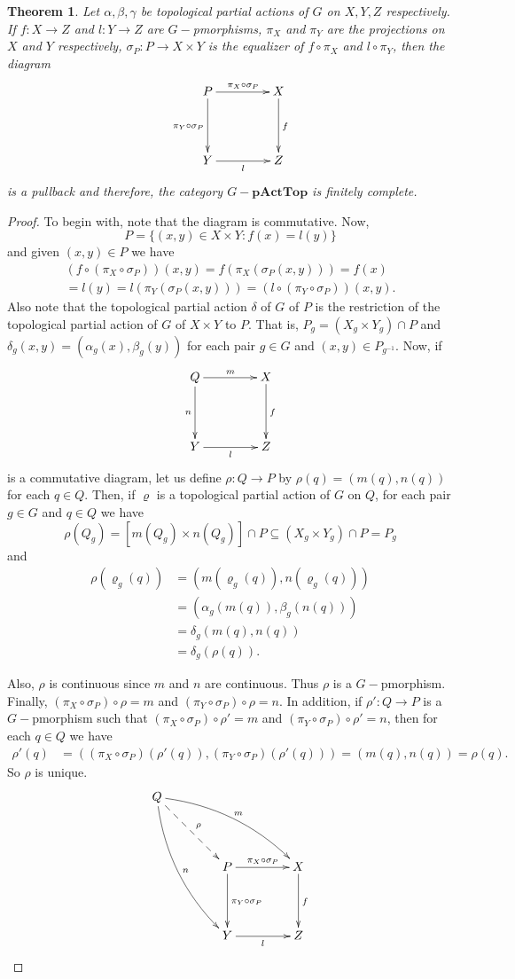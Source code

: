\documentclass[sn-mathphys-num]{sn-jnl}%
\theoremstyle{thmstyleone}%
\newtheorem{theorem}{Theorem}%
\theoremstyle{thmstyletwo}%
\theoremstyle{thmstylethree}%
\begin{document}
\begin{theorem}
Let $ \alpha, \beta, \gamma $ be topological partial actions of $ G $ on $ X, Y, Z $ respectively. If $ f: X \to Z $ and $l: Y \to Z $ are $G-$pmorphisms, $\pi_X$ and $ \pi_Y $ are the projections  on $ X $ and $ Y $ respectively, $\sigma_P:P\to X\times Y$ is the equalizer of $f\circ \pi_X$ and $l\circ \pi_Y$, then the diagram
$$
\xymatrix@=1.5cm{
P \ar[r]^{\pi_X\circ\sigma_P} \ar[d]_{\pi_Y\circ\sigma_P} & X\ar[d]^{f}\\
Y\ar[r]_{l}& Z
}
$$
is a pullback and therefore, the category $G-\mathbf{pActTop}$ is finitely complete.
\end{theorem}
\begin{proof}[Proof]
To begin with, note that the diagram is commutative.
Now, $$ P = \{(x, y) \in X \times Y: f (x) = l (y) \}$$  and given $ (x, y) \in P $ we have
\begin{multline*}
(f \circ (\pi_X\circ\sigma_P)) (x, y) = f(\pi_X(\sigma_P(x, y))) =f (x)\\
= l (y) = l(\pi_Y(\sigma_P(x, y)))=(l \circ (\pi_Y\circ\sigma_P)) (x, y).
\end{multline*}
Also note that the topological partial action $\delta$ of $G$ of $P$ is the restriction of the topological partial action of $G$ of $X\times Y$ to $P$.
That is, $P_g=(X_g\times Y_g)\cap P$ and $\delta_g(x,y)=(\alpha_g(x),\beta_g(y))$ for each pair $g\in G$ and $(x,y)\in P_{g^{-1}}$.
Now, if
$$
\xymatrix@=1.5cm{
Q \ar[r]^{m} \ar[d]_{n} & X\ar[d]^{f}\\
Y\ar[r]_{l}& Z
}
$$
is a commutative diagram, let us define $ \rho: Q \to P $ by $ \rho (q) = (m (q), n (q)) $ for each $ q \in Q $.
Then, if $\varrho$ is a topological partial  action of $G$ on $Q$, for each pair $ g \in G $ and $ q \in Q $ we have
$$\rho(Q_g)=[m(Q_g)\times n(Q_g)]\cap P\subseteq(X_g\times Y_g)\cap P=P_g$$
and
\begin{align*}
\rho (\varrho_g(q)) &= (m (\varrho_g(q)), n (\varrho_g( q)))\\
&= (\alpha_g(m (q)), \beta_g(n (q)))\\
&= \delta_g(m (q),n (q))\\
&=\delta_g(\rho(q)).
\end{align*}

Also, $\rho$ is continuous since $ m $ and $ n $ are continuous. Thus $\rho$ is a $ G-$pmorphism.\\

Finally, $ (\pi_X\circ\sigma_P) \circ \rho = m $ and $ (\pi_Y\circ\sigma_P) \circ \rho = n $.
In addition, if $ \rho ': Q \to P $ is a $ G-$pmorphism such that $ (\pi_X\circ\sigma_P) \circ \rho' = m $ and $ (\pi_Y\circ\sigma_P) \circ \rho '= n $, then for each $ q \in Q $ we have
\begin{align*}
 \rho '(q) &= ((\pi_X\circ\sigma_P)(\rho' (q)), (\pi_Y\circ\sigma_P) (\rho '(q))) = (m (q), n (q) ) = \rho (q).
 \end{align*}
So $ \rho $ is unique.
$$
\xymatrix@=1.5cm{
Q\ar@{-->}[rd]^{\rho}\ar@/_{-1pc}/[rrd]^m \ar@/_{1pc}/[ddr]^n&&\\
&P \ar[r]^{\pi_X\circ\sigma_P} \ar[d]^{\pi_Y\circ\sigma_P} & X\ar[d]^{f}\\
&Y\ar[r]_{l}& Z
}
$$


\end{proof}
\end{document}
